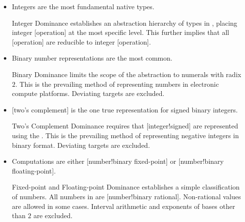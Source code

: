 \begin{itemize}
    \item[\Assume{asm:ints}] Integers are the most fundamental native types.

    \begin{highlight}{Integer Dominance}
         establishes an abstraction hierarchy of types in \basetwo, placing integer [operation] at the most specific level.
        This further implies that all [operation] are reducible to integer [operation].
    \end{highlight}

    \item[\Assume{asm:base2}] Binary number representations are the most common.

    \begin{highlight}{Binary Dominance}
         limits the scope of the \basetwo abstraction to numerals with radix \(2\).
        This is the prevailing method of representing numbers in electronic compute platforms.
        Deviating targets are excluded.
    \end{highlight}

    \item[\Assume{asm:twos_compl}] [two's complement] is the one true representation for signed binary integers.

    \begin{highlight}{Two's Complement Dominance}
         requires that [integer!signed] are represented using the .
        This is the prevailing method of representing negative integers in binary format.
        Deviating targets are excluded.
    \end{highlight}

    \item[\Assume{asm:fixed_float}] Computations are either [number!binary fixed-point] or [number!binary floating-point].

    \begin{highlight}{Fixed-point and Floating-point Dominance}
         establishes a simple classification of numbers.
        All numbers in \basetwo are [number!binary rational].
        Non-rational values are allowed in some cases.
        Interval arithmetic and exponents of bases other than \(2\) are excluded.
    \end{highlight}
\end{itemize}

